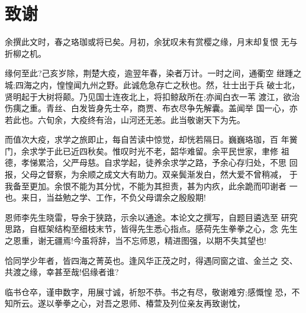 
\clearpage
{}
{}

\chapter*{致谢}
余撰此文时，春之珞珈或将已矣。月初，余犹叹未有赏樱之缘，月末却复恨
无与折柳之机。

  缘何至此?己亥岁除，荆楚大疫，逾翌年春，染者万计。一时之间，通衢空
继踵之城;四海之内，惶惶闻九州之野。此诚危急存亡之秋也。然，壮士出于兵
破士北，贤明起于大树将颠。乃见国士连夜北上，将扣鲸敌所在;亦闻白衣一苇
渡江，欲治伤痍之重。青丝、白发皆身先士卒，商贾、布衣尽争先解囊。盖闻举
国一心，亦若此也。六旬余，大疫终有治，山河还无恙。此当敬谢天下为先。

而值次大疫，求学之旅即止，每自苦读中惊觉，却恍若隔日。巍巍珞珈，百
年黉门，余求学于此已近四秋矣。惟叹时光不老，韶华难留。余平民世家，聿修
祖德，孝悌累洽，父严母慈。自求学起，徒养余求学之路，予余心存归处，不思
回报，父母之督察，为余顺之成文大有助力。双亲鬓渐发白，然大爱不曾稍减，
于我备至更加。余恨不能为其分忧，不能为其担责，甚为内疚，此余跪而叩谢者
一也。来日，当益勉之学、工作，不负父母谓余之殷殷期!

  恩师李先生晓雷，导余于狭路，示余以通途。本论文之撰写，自题目遴选至
研究思路，自框架结构至细枝末节，皆得先生悉心指点。感荷先生拳拳之心，念
先生之恩重，谢无疆焉!今虽将辞，当不忘师恩，精进图强，以期不失其望也!

  恰同学少年者，皆四海之菁英也。逢风华正茂之时，得遇同窗之谊、金兰之
交、共渡之缘，幸甚至哉!侣缘者谁?

  临书仓卒，谨申数字，用展寸诚，祈恕不恭。书之有尽，敬谢难穷;感慨惶
恐，不知所云。遂以拳拳之心，对吾之恩师、椿萱及列位亲友再致谢忱，